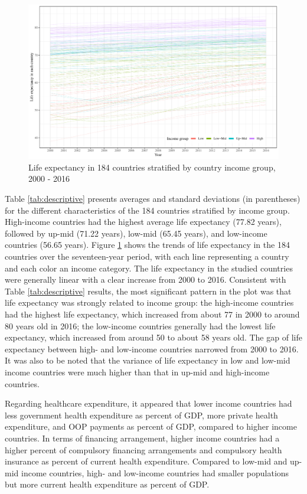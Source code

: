 \documentclass[]{elsarticle} %
\makeatletter
\def\maxwidth{\ifdim\Gin@nat@width>\linewidth\linewidth
\else\Gin@nat@width\fi}
\let\Oldincludegraphics\includegraphics
\renewcommand{\includegraphics}[1]{\Oldincludegraphics[width=\maxwidth]{#1}}
\makeatother
\begin{document}
\begin{figure}
\centering
\includegraphics{Figures/fig1.pdf}
\caption{\label{fig:fig1}Life expectancy in 184 countries stratified by country income group, 2000 - 2016}
\end{figure}

Table \ref{tab:descriptive} presents averages and standard deviations (in parentheses) for the different characteristics of the 184 countries stratified by income group.
High-income countries had the highest average life expectancy (77.82 years), followed by up-mid (71.22 years), low-mid (65.45 years), and low-income countries (56.65 years).
Figure \ref{fig:fig1} shows the trends of life expectancy in the 184 countries over the seventeen-year period, with each line representing a country and each color an income category.
The life expectancy in the studied countries were generally linear with a clear increase from 2000 to 2016.
Consistent with Table \ref{tab:descriptive} results, the most significant pattern in the plot was that life expectancy was strongly related to income group: the high-income countries had the highest life expectancy, which increased from about 77 in 2000 to around 80 years old in 2016;
the low-income countries generally had the lowest life expectancy, which increased from around 50 to about 58 years old.
The gap of life expectancy between high- and low-income countries narrowed from 2000 to 2016.
It was also to be noted that the variance of life expectancy in low and low-mid income countries were much higher than that in up-mid and high-income countries.

Regarding healthcare expenditure, it appeared that lower income countries had less government health expenditure as percent of GDP, more private health expenditure, and OOP payments as percent of GDP, compared to higher income countries. In terms of financing arrangement, higher income countries had a higher percent of compulsory financing arrangements and compulsory health insurance as percent of current health expenditure. Compared to low-mid and up-mid income countries, high- and low-income countries had smaller populations but more current health expenditure as percent of GDP.
\end{document}
